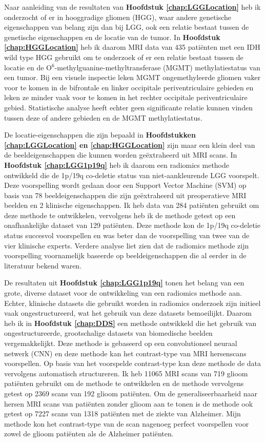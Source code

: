 Naar aanleiding van de resultaten van \textbf{Hoofdstuk \ref{chap:LGGLocation}} heb ik onderzocht of er in hooggradige gliomen (HGG), waar andere genetische eigenschappen van belang zijn dan bij LGG, ook een relatie bestaat tussen de genetische eigenschappen en de locatie van de tumor.
In \textbf{Hoofdstuk \ref{chap:HGGLocation}} heb ik daarom MRI data van 435 pati{\"e}nten met een IDH wild type HGG gebruikt om te onderzoek of er een relatie bestaat tussen de locatie en de O$^6$-methylguanine-methyltransferase (MGMT) methylatiestatus van een tumor.
Bij een visuele inspectie leken  MGMT ongemethyleerde gliomen vaker voor te komen in de bifrontale en linker occipitale periventriculaire gebieden en leken ze minder vaak voor te komen in het rechter occipitale periventriculaire gebied.
Statistische analyse heeft echter geen significante relatie kunnen vinden tussen deze of andere gebieden en de MGMT methylatiestatus.

De locatie-eigenschappen die zijn bepaald in \textbf{Hoofdstukken \ref{chap:LGGLocation} en \ref{chap:HGGLocation}} zijn maar een klein deel van de beeldeigenschappen die kunnen worden ge{\"e}xtraheerd uit MRI scans.
In \textbf{Hoofdstuk \ref{chap:LGG1p19q}} heb ik daarom een radiomics methode ontwikkeld die de 1p/19q co-deletie status van niet-aankleurende LGG voorspelt.
Deze voorspelling wordt gedaan door een Support Vector Machine (SVM) op basis van 78 beeldeigenschappen die zijn ge{\"e}xtraheerd uit preoperatieve MRI beelden en 2 klinische eigenschappen.
Ik heb data van 284 pati{\"e}nten gebruikt om deze methode te ontwikkelen, vervolgens heb ik de methode getest op een onafhankelijke dataset van 129 pati{\"e}nten.
Deze methode kon de 1p/19q co-deletie status succesvol voorspellen en was beter dan de voorspelling van twee van de vier klinische experts.
Verdere analyse liet zien dat de radiomics methode zijn voorspelling voornamelijk baseerde op beeldeigenschappen die al eerder in de literatuur bekend waren.

De resultaten uit \textbf{Hoofdstuk \ref{chap:LGG1p19q}} tonen het belang van een grote, diverse dataset voor de ontwikkeling van een radiomics methode aan.
Echter, klinische datasets die gebruikt worden in radiomics onderzoek zijn initieel vaak ongestructureerd, wat het gebruik van deze datasets bemoeilijkt.
Daarom heb ik in \textbf{Hoofdstuk \ref{chap:DDS}} een methode ontwikkeld die het gebruik van ongestructureerde, grootschalige datasets van biomedische beelden vergemakkelijkt.
Deze methode is gebaseerd op een convolutioneel neuraal netwerk (CNN) en deze methode kan het contrast-type van  MRI hersenscans voorspellen.
Op basis van het voorspelde contrast-type kan deze methode de data vervolgens automatisch structureren.
Ik heb 11065 MRI scans van 719 glioom pati{\"e}nten gebruikt om de methode te ontwikkelen en de methode vervolgens getest op 2369 scans van 192 glioom pati{\"e}nten.
Om de generaliseerbaarheid naar hersen MRI scans van pati{\"e}nten zonder glioom aan te tonen is de methode ook getest op 7227 scans van 1318 pati{\"e}nten met de ziekte van Alzheimer.
Mijn methode kon het contrast-type van de scan nagenoeg perfect voorspellen voor zowel de glioom pati{\"e}nten als de Alzheimer pati{\"e}nten.

